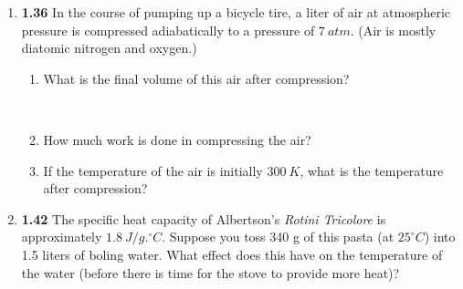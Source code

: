 \documentclass[fleqn]{article}
\begin{document}
\begin{enumerate}
    \item \textbf{1.36} In the course of pumping up a bicycle tire, a liter of air at atmospheric pressure is compressed adiabatically 
    to a pressure of $7 ~ atm$. (Air is mostly diatomic nitrogen and oxygen.)
    \begin{enumerate}
      \item What is the final volume of this air after compression?

        \textcolor{hwColor}{
          \\
        }

      \item How much work is done in compressing the air?

      
      \item If the temperature of the air is initially $300 ~ K$, what is the temperature after compression?


    \end{enumerate}


    \item \textbf{1.42} The specific heat capacity of Albertson's \emph{Rotini Tricolore} is approximately $1.8 ~ J/g.^{\circ}C$. Suppose 
    you toss 340 g of this pasta (at $25^{\circ}C$) into 1.5 liters of boling water. What effect does this have on the temperature of the
    water (before there is time for the stove to provide more heat)?


  \end{enumerate}
\end{document}
